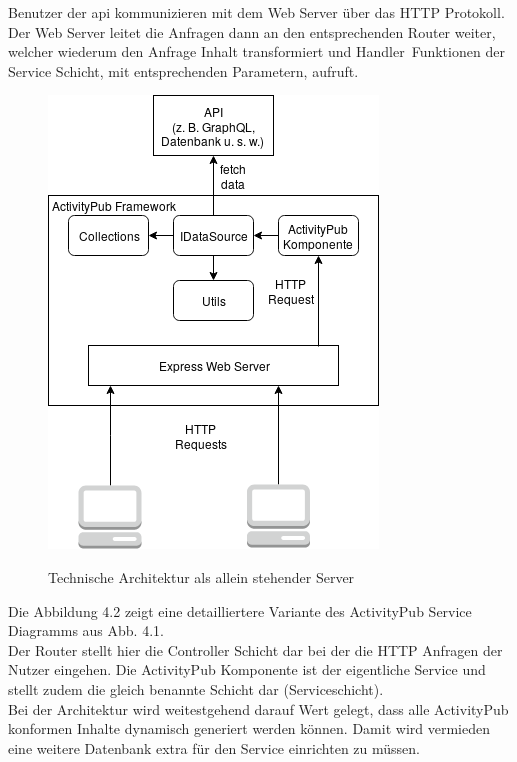 	Benutzer der \gls{api} kommunizieren mit dem Web Server über das HTTP Protokoll. Der Web Server leitet die Anfragen dann an den entsprechenden Router weiter, welcher wiederum den Anfrage Inhalt transformiert und \glqq Handler\grqq~Funktionen der Service Schicht, mit entsprechenden Parametern, aufruft.
	\begin{figure}[h]
		\begin{minipage}{\textwidth}
			\centering
			\includegraphics[scale=0.6]{figures/technical-architecture-standalone.png}
			\label{fig:technische-architektur-standalone}
			\caption{Technische Architektur als allein stehender Server}
		\end{minipage}
	\end{figure}

	Die Abbildung 4.2 zeigt eine detailliertere Variante des ActivityPub Service Diagramms aus Abb. 4.1.\\
	
	Der Router stellt hier die Controller Schicht dar bei der die HTTP Anfragen der Nutzer eingehen. Die ActivityPub Komponente ist der eigentliche Service und stellt zudem die gleich benannte Schicht dar (Serviceschicht).\\
	
	Bei der Architektur wird weitestgehend darauf Wert gelegt, dass alle ActivityPub konformen Inhalte dynamisch generiert werden können. Damit wird vermieden eine weitere Datenbank extra für den Service einrichten zu müssen.\\